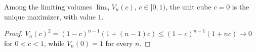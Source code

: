 \begin{theorem}\label{thm:main}
Among the limiting volumes $\lim_nV_n(c)$, $c\in[0,1)$, the unit cube $c=0$ is the unique maximizer, with value $1$.
\end{theorem}
\begin{proof}
$V_n(c)^2=(1-c)^{n-1}(1+(n-1)c)\le(1-c)^{n-1}(1+nc)\to0$ for $0<c<1$, while $V_n(0)=1$ for every $n$.
\end{proof}
